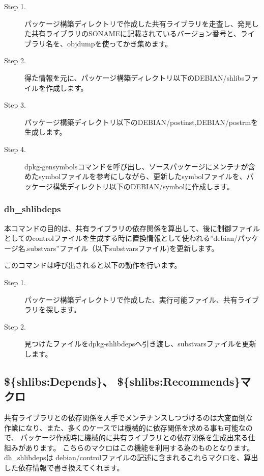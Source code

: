 \documentclass[mingoth,a4paper]{jsarticle}
\begin{document}
\begin{description}
\item [Step 1.] パッケージ構築ディレクトリで作成した共有ライブラリを走査し、発見した共有ライブラリのSONAMEに記載されているバージョン番号と、ライブラリ名を、objdumpを使ってかき集めます。
\item [Step 2.] 得た情報を元に、パッケージ構築ディレクトリ以下のDEBIAN/shlibsファイルを作成します。
\item [Step 3.] パッケージ構築ディレクトリ以下のDEBIAN/postinst,DEBIAN/postrmを生成します。
\item [Step 4.] dpkg-gensymbolsコマンドを呼び出し、ソースパッケージにメンテナが含めたsymbolファイルを参考にしながら、更新したsymbolファイルを、パッケージ構築ディレクトリ以下のDEBIAN/symbolに作成します。
\end{description}

\subsubsection{dh\_shlibdeps}

 本コマンドの目的は、共有ライブラリの依存関係を算出して、後に制御ファイルとしてのcontrolファイルを生成する時に置換情報として使われる''debian/パッケージ名.substvars''ファイル（以下substvarsファイル)を更新します。

このコマンドは呼び出されると以下の動作を行います。

\begin{description}
\item [Step 1.] パッケージ構築ディレクトリで作成した、実行可能ファイル、共有ライブラリを探します。
\item [Step 2.] 見つけたファイルをdpkg-shlibdepsへ引き渡し、substvarsファイルを更新します。
\end{description}


\subsection{\$\{shlibs:Depends\}、 \$\{shlibs:Recommends\}マクロ}

 共有ライブラリとの依存関係を人手でメンテナンスしつづけるのは大変面倒な
作業になり、また、多くのケースでは機械的に依存関係を求める事も可能なので、
パッケージ作成時に機械的に共有ライブラリとの依存関係を生成出来る仕組みがあります。
こちらのマクロはこの機能を利用する為のものとなります。 dh\_shlibdepsは
debian/controlファイルの記述に含まれるこれらマクロを、算出した依存情報で書き換えてくれます。
\end{document}
